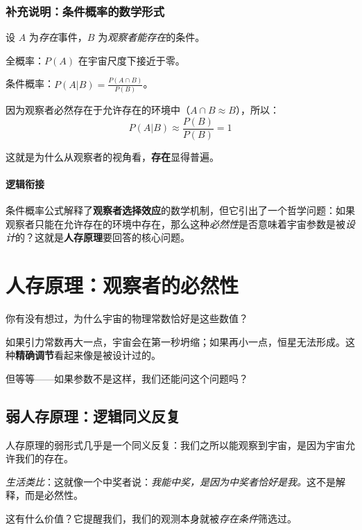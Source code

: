 \documentclass[../main.tex]{subfiles}
\begin{document}
	\subsubsection*{补充说明：条件概率的数学形式}
	\begin{tcolorbox}[
		colback=gray!5,
		colframe=gray!40,
		title=\small \textit{严谨推导（可跳过）},
		fonttitle=\bfseries
		]
		\small
		设 $A$ 为\textit{存在}事件，$B$ 为\textit{观察者能存在}的条件。

		全概率：$P(A)$ 在宇宙尺度下接近于零。

		条件概率：$P(A|B) = \frac{P(A \cap B)}{P(B)}$。

		因为观察者必然存在于允许存在的环境中（$A \cap B \approx B$），所以：
		\[ P(A|B) \approx \frac{P(B)}{P(B)} = 1 \]

		这就是为什么从观察者的视角看，\textbf{存在}显得普遍。
	\end{tcolorbox}

	\paragraph*{逻辑衔接}
	条件概率公式解释了\textbf{观察者选择效应}的数学机制，但它引出了一个哲学问题：如果观察者只能在允许存在的环境中存在，那么这种\textit{必然性}是否意味着宇宙参数是被\textit{设计}的？这就是\textbf{人存原理}要回答的核心问题。

	\section{人存原理：观察者的必然性}

	你有没有想过，为什么宇宙的物理常数恰好是这些数值？

	如果引力常数再大一点，宇宙会在第一秒坍缩；如果再小一点，恒星无法形成。这种\textbf{精确调节}看起来像是被设计过的。

	但等等——如果参数不是这样，我们还能问这个问题吗？

	\subsection{弱人存原理：逻辑同义反复}

	人存原理的弱形式几乎是一个同义反复：我们之所以能观察到宇宙，是因为宇宙允许我们的存在。

	\textit{生活类比}：这就像一个中奖者说：\textit{我能中奖，是因为中奖者恰好是我。}这不是解释，而是必然性。

	这有什么价值？它提醒我们，我们的观测本身就被\textit{存在条件}筛选过。
\end{document}
